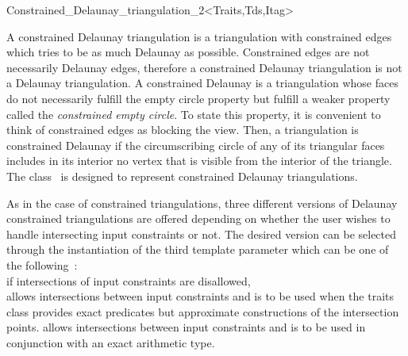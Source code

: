 

\begin{ccRefClass}{Constrained_Delaunay_triangulation_2<Traits,Tds,Itag>}  %


\ccDefinition
A constrained Delaunay triangulation is a triangulation with
constrained edges which tries to be as much Delaunay as possible.
Constrained edges are not necessarily Delaunay edges,
therefore a constrained Delaunay triangulation is not a Delaunay
triangulation. A constrained Delaunay is a triangulation
whose faces do not
necessarily fulfill the empty circle property
but fulfill a weaker property called the
{\em constrained empty circle}.
 To state this property,
it is convenient to think of  constrained
edges as blocking the view. Then, a triangulation is 
constrained Delaunay if
 the circumscribing circle
of any of its triangular faces includes in its interior 
no vertex  that is visible
from the interior of the triangle.  
The class \ccRefName\ is designed to represent
constrained Delaunay triangulations.

As in the case of constrained triangulations, three different versions
of Delaunay constrained triangulations are offered
depending on whether the user wishes to handle
intersecting input constraints or not.
The desired version can  be selected through the instantiation of the
third template parameter  which can be one of the
following~: \\
 if  intersections of
 input constraints are disallowed,\\
 allows intersections between input
constraints
 and is to be used when the traits
class
provides exact predicates but approximate constructions of the
intersection points.
 allows intersections between input
constraints
 and is to be used in conjunction
with an exact arithmetic type.



\end{ccRefClass}
